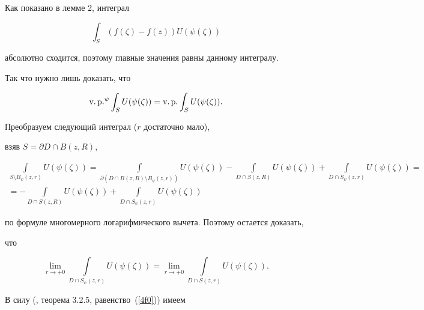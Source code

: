 \begin{pf}


Как показано в лемме 2, интеграл


$$


\int_S(f(\zeta)-f(z))U(\psi(\zeta))


$$


абсолютно сходится, поэтому главные значения равны данному интегралу.


Так что нужно лишь доказать, что


$$


\text{v.\,p.}^\psi \int_SU(\psi(\zeta))=


\text{v.\,p.} \int_SU(\psi(\zeta)).


$$





Преобразуем следующий интеграл ($r$ достаточно мало),


взяв $S=\partial D\cap B(z,R)$,


\begin{multline*}


\int\limits_{S\setminus B_\psi(z,r)}U(\psi(\zeta))=


\int\limits_{\partial(D\cap B(z,R)\setminus B_\psi(z,r))}U(\psi(\zeta))-


\int\limits_{D\cap S(z,R)}U(\psi(\zeta))+


\int\limits_{D\cap S_\psi(z,r)}U(\psi(\zeta))= \\


%


=-\int\limits_{D\cap S(z,R)}U(\psi(\zeta))+


\int\limits_{D\cap S_\psi(z,r)}U(\psi(\zeta))


\end{multline*}


по формуле многомерного логарифмического вычета. Поэтому остается доказать,


что


$$


\lim_{r\to+0}\int\limits_{D\cap S_\psi(z,r)}U(\psi(\zeta))=


\lim_{r\to+0}\int\limits_{D\cap S(z,r)}U(\psi(\zeta)).


$$





В силу (\cite{Fed}, теорема 3.2.5, равенство~(\ref{4f0})) имеем


$$





\end{pf}
